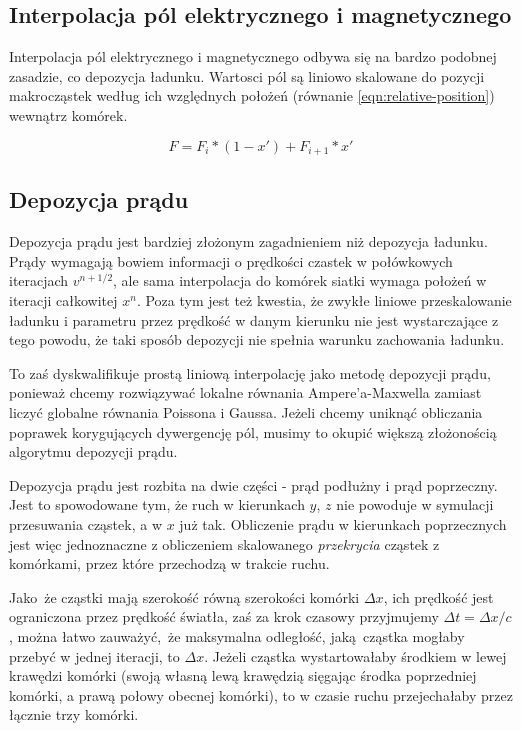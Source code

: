 \subsection{Interpolacja pól elektrycznego i magnetycznego}

Interpolacja pól elektrycznego i magnetycznego odbywa się na bardzo podobnej
zasadzie, co depozycja ładunku. Wartosci pól są liniowo skalowane do pozycji
makrocząstek według ich względnych położeń (równanie
\ref{eqn:relative-position}) wewnątrz komórek.

\begin{equation}
    F = F_i * (1-x') + F_{i+1} * x'
    \label{eqn:field-interpolation}
\end{equation}

\subsection{Depozycja prądu}

Depozycja prądu jest bardziej złożonym zagadnieniem niż depozycja ładunku.
Prądy wymagają bowiem informacji o prędkości czastek w połówkowych
iteracjach $v^{n+1/2}$, ale sama interpolacja do komórek siatki wymaga
położeń w iteracji całkowitej $x^{n}$. Poza tym jest też kwestia, że zwykłe
liniowe przeskalowanie ładunku i parametru  przez prędkość w
danym kierunku nie jest wystarczające z tego powodu, że taki sposób
depozycji nie spełnia warunku zachowania ładunku.



To zaś dyskwalifikuje prostą liniową interpolację jako metodę depozycji
prądu, ponieważ chcemy rozwiązywać lokalne równania Ampere'a-Maxwella
 zamiast liczyć globalne równania Poissona i Gaussa.
Jeżeli chcemy uniknąć obliczania poprawek korygujących dywergencję pól,
musimy to okupić większą złożonością algorytmu depozycji prądu.

Depozycja prądu jest rozbita na dwie części - prąd podłużny i prąd
poprzeczny. Jest to spowodowane tym, że ruch w kierunkach $y$, $z$ nie
powoduje w symulacji przesuwania cząstek, a w $x$ już tak. Obliczenie prądu
w kierunkach poprzecznych jest więc jednoznaczne z obliczeniem skalowanego
\emph{przekrycia} cząstek z komórkami, przez które przechodzą w trakcie
ruchu.

Jako że cząstki mają szerokość równą szerokości komórki $\Delta x$, ich
prędkość jest ograniczona przez prędkość światła, zaś za krok czasowy
przyjmujemy $\Delta t = \Delta x/c$, można łatwo zauważyć, że maksymalna
odległość, jaką cząstka mogłaby przebyć w jednej iteracji, to $\Delta x$.
Jeżeli cząstka wystartowałaby środkiem w lewej krawędzi komórki (swoją
własną lewą krawędzią sięgając środka poprzedniej komórki, a prawą połowy
obecnej komórki), to w czasie ruchu przejechałaby 
przez łącznie trzy komórki. 

